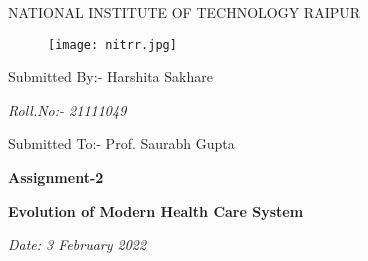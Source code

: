 \documentclass[12pt,a4paper]{article}
\begin{document}


\hspace{10cm}

\begin{center}
{\large NATIONAL INSTITUTE OF TECHNOLOGY RAIPUR}
\end{center}

\hspace{10cm}


\begin{figure}
\centering
\texttt{[image: nitrr.jpg]}
\end{figure}



\hspace{11cm}

\begin{center}
{\selectfont \large Submitted By:- Harshita Sakhare }
\end{center}




\hspace{10cm}

\begin{center}
\textit{\large Roll.No:- 21111049}
\end{center}



\hspace{10cm}


\begin{center}
\textsf{\large Submitted To:- Prof. Saurabh Gupta}
\end{center}


\hspace{10cm}

\begin{center}
\textbf{Assignment-2}
\end{center}


\hspace{10cm}


\begin{center}
\textbf{\large Evolution of Modern Health Care System}
\end{center}

\begin{center}
\textit{Date: 3 February 2022}
\end{center}
\end{document}
